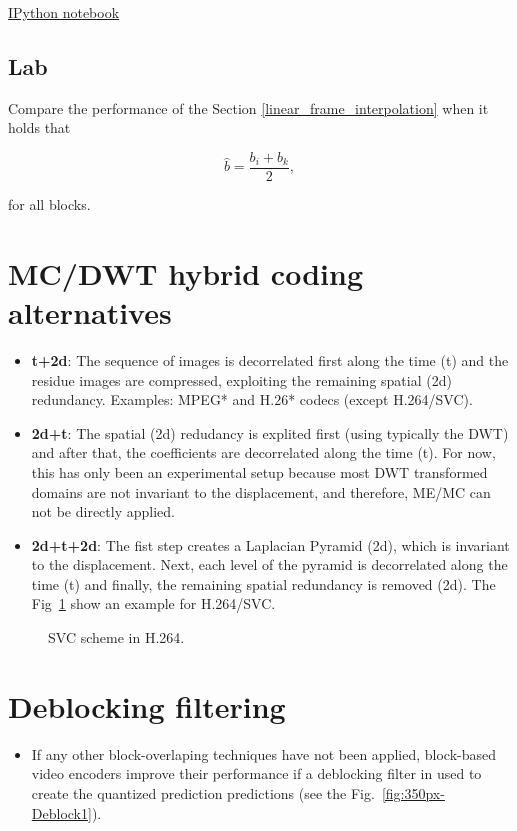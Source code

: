 \href{https://nbviewer.jupyter.org/github/vicente-gonzalez-ruiz/video_coding/blob/master/subpixel_accuracy.ipynb}{IPython notebook}

\subsection*{Lab}
Compare the performance of the Section \ref{linear_frame_interpolation}
when it holds that

\begin{equation}
   \hat{b} = \frac{b_i + b_k}{2},
\end{equation}

for all blocks.

\section{MC/DWT hybrid coding alternatives}
\begin{itemize}
\item
  \textbf{t+2d}: The sequence of images is decorrelated first along the
  time (t) and the residue images are compressed, exploiting the
  remaining spatial (2d) redundancy. Examples: MPEG* and H.26* codecs
  (except H.264/SVC).
\item
  \textbf{2d+t}: The spatial (2d) redudancy is explited first (using
  typically the DWT) and after that, the coefficients are decorrelated
  along the time (t). For now, this has only been an experimental setup
  because most DWT transformed domains are not invariant to the
  displacement, and therefore, ME/MC can not be directly applied.
\item
  \textbf{2d+t+2d}: The fist step creates a Laplacian Pyramid (2d),
  which is invariant to the displacement. Next, each level of the
  pyramid is decorrelated along the time (t) and finally, the
  remaining spatial redundancy is removed (2d). The
  Fig~\ref{fig:H264-S-SVC} show an example for H.264/SVC.
\end{itemize}

\begin{figure}
  \caption{SVC scheme in H.264.}
  \label{fig:H264-S-SVC}
\end{figure}

\section{Deblocking filtering}
\begin{itemize}
\tightlist
\item
  If any other block-overlaping techniques have not been applied,
  block-based video encoders improve their performance if a deblocking
  filter in used to create the quantized prediction predictions (see
  the Fig.~\ref{fig:350px-Deblock1}).
\end{itemize}


